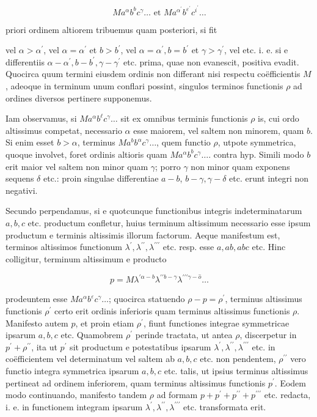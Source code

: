 \documentclass[twoside,12pt, showframe]{memoir}
\begin{document}
\[
M a^{\alpha} b^{b} c^{\gamma} \ldots \text { et } M a^{\alpha^{\prime}} b^{\varepsilon^{\prime}} c^{i^{\prime}} \ldots
\]

priori ordinem altiorem tribuemus quam posteriori, si fit

vel \(\alpha>\alpha^{\prime}\), vel \(\alpha=\alpha^{\prime}\) et \(b>b^{\prime}\), vel \(\alpha=\alpha^{\prime}, b=b^{\prime}\) et \(\gamma>\gamma^{\prime}\), vel etc.
i. e. si e differentiis \(\alpha-\alpha^{\prime}, b-b^{\prime}, \gamma-\gamma^{\prime}\) etc. prima, quae non evanescit, positiva evadit. Quocirca quum termini eiusdem ordinis non differant nisi respectu coëfficientis \(M\), adeoque in terminum unum conflari possint, singulos terminos functionis \(\rho\) ad ordines diversos pertinere supponemus.

Iam observamus, si \(M a^{\alpha} b^{\ell} c^{\gamma} \ldots\) sit ex omnibus terminis functionis \(\rho\) is, cui ordo altissimus competat, necessario \(\alpha\) esse maiorem, vel saltem non minorem, quam \(b\). Si enim esset \(b>\alpha\), terminus \(M a^{b} b^{\alpha} c^{\gamma} \ldots\), quem functio \(\rho\), utpote symmetrica, quoque involvet, foret ordinis altioris quam \(M a^{\alpha} b^{b} c^{\gamma} \ldots\). contra hyp. Simili modo \(b\) erit maior vel saltem non minor quam \(\gamma\); porro \(\gamma\) non minor quam exponens sequens \(\delta\) etc.: proin singulae differentiae \(a-b\), \(b-\gamma, \gamma-\delta\) etc. erunt integri non negativi.

Secundo perpendamus, si e quotcunque functionibus integris indeterminatarum \(a, b, c\) etc. productum confletur, huius terminum altissimum necessario esse ipsum productum e terminis altissimis illorum factorum. Aeque manifestum est, terminos altissimos functionum \(\lambda^{\prime}, \lambda^{\prime \prime}, \lambda^{\prime \prime \prime}\) etc. resp. esse \(a, a b, a b c\) etc. Hinc colligitur, terminum altissimum e producto

\[
p=M \lambda^{\prime \alpha-b} \lambda^{\prime \prime b-\gamma} \lambda^{\prime \prime \prime \gamma-\hat{o}} \ldots
\]

prodeuntem esse \(M a^{\alpha} b^{\varepsilon} c^{\gamma} \ldots\); quocirca statuendo \(\rho-p=\rho^{\prime}\), terminus altissimus functionis \(\rho^{\prime}\) certo erit ordinis inferioris quam terminus altissimus functionis \(\rho\). Manifesto autem \(p\), et proin etiam \(\rho^{\prime}\), fiunt functiones integrae symmetricae ipsarum \(a, b, c\) etc. Quamobrem \(\rho^{\prime}\) perinde tractata, ut antea \(\rho\), discerpetur in \(p^{\prime}+\rho^{\prime \prime}\), ita ut \(p^{\prime}\) sit productum e potestatibus ipsarum \(\lambda^{\prime}, \lambda^{\prime \prime}, \lambda^{\prime \prime \prime}\) etc. in coëfficientem vel determinatum vel saltem ab \(a, b, c\) etc. non pendentem, \(\rho^{\prime \prime}\) vero functio integra symmetrica ipsarum \(a, b, c\) etc. talis, ut ipsius terminus altissimus pertineat ad ordinem inferiorem, quam terminus altissimus functionis \(p^{\prime}\). Eodem modo continuando, manifesto tandem \(\rho\) ad formam \(p+p^{\prime}+p^{\prime \prime}+p^{\prime \prime \prime}\) etc. redacta, i. e. in functionem integram ipsarum \(\lambda^{\prime}, \lambda^{\prime \prime}, \lambda^{\prime \prime \prime}\) etc. transformata erit.
\end{document}
